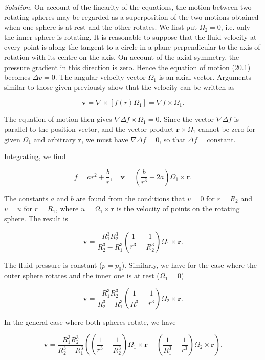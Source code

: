 \documentclass{article}
\begin{document}
\textit{Solution.} On account of the linearity of the equations, the motion between two rotating spheres may be regarded as a superposition of the two motions obtained when one sphere is at rest and the other rotates. We first put $\Omega_2 = 0$, i.e. only the inner sphere is rotating. It is reasonable to suppose that the fluid velocity at every point is along the tangent to a circle in a plane perpendicular to the axis of rotation with its centre on the axis. On account of the axial symmetry, the pressure gradient in this direction is zero. Hence the equation of motion (20.1) becomes $\Delta v = 0$. The angular velocity vector $\Omega_1$ is an axial vector. Arguments similar to those given previously show that the velocity can be written as

$$
\mathbf{v} = \nabla \times [f(r) \Omega_1] = \nabla f \times \Omega_1.
$$

The equation of motion then gives $\nabla \Delta f \times \Omega_1 = 0$. Since the vector $\nabla \Delta f$ is parallel to the position vector, and the vector product $\mathbf{r} \times \Omega_1$ cannot be zero for given $\Omega_1$ and arbitrary $\mathbf{r}$, we must have $\nabla \Delta f = 0$, so that $\Delta f = \text{constant}$.

Integrating, we find

$$
f = ar^2 + \frac{b}{r}, \quad \mathbf{v} = \left( \frac{b}{r^3} - 2a \right) \Omega_1 \times \mathbf{r}.
$$

The constants $a$ and $b$ are found from the conditions that $v = 0$ for $r = R_2$ and $v = u$ for $r = R_1$, where $u = \Omega_1 \times \mathbf{r}$ is the velocity of points on the rotating sphere. The result is

$$
\mathbf{v} = \frac{R_1^3 R_2^3}{R_2^3 - R_1^3} \left( \frac{1}{r^3} - \frac{1}{R_2^3} \right) \Omega_1 \times \mathbf{r}.
$$

The fluid pressure is constant ($p = p_0$). Similarly, we have for the case where the outer sphere rotates and the inner one is at rest ($\Omega_1 = 0$)

$$
\mathbf{v} = \frac{R_1^3 R_2^3}{R_2^3 - R_1^3} \left( \frac{1}{R_1^3} - \frac{1}{r^3} \right) \Omega_2 \times \mathbf{r}.
$$

In the general case where both spheres rotate, we have

$$
\mathbf{v} = \frac{R_1^3 R_2^3}{R_2^3 - R_1^3} \left( \left( \frac{1}{r^3} - \frac{1}{R_2^3} \right) \Omega_1 \times \mathbf{r} + \left( \frac{1}{R_1^3} - \frac{1}{r^3} \right) \Omega_2 \times \mathbf{r} \right).
$$
\end{document}
